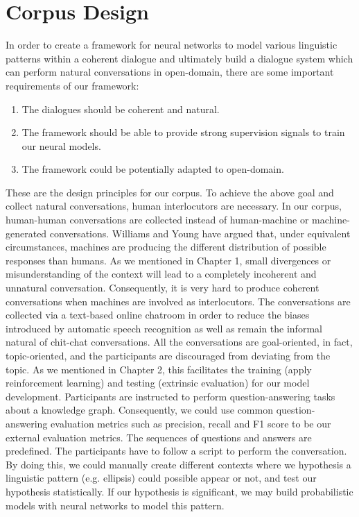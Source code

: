 \documentclass[bsc,frontabs,twoside,singlespacing,parskip,deptreport]{infthesis}     %
\begin{document}
\section{Corpus Design}

In order to create a framework for neural networks to model various linguistic patterns within a coherent dialogue and ultimately build a dialogue system which can perform natural conversations in open-domain, there are some important requirements of our framework:

\begin{enumerate}
   \item The dialogues should be coherent and natural.
   
   \item The framework should be able to provide strong supervision signals to train our neural models. 
 
   \item The framework could be potentially adapted to open-domain.
\end{enumerate}

These are the design principles for our corpus. To achieve the above goal and collect natural conversations, human interlocutors are necessary. In our corpus, human-human conversations are collected instead of human-machine or machine-generated conversations. Williams and Young \cite{williams2007partially} have argued that, under equivalent circumstances, machines are producing the different distribution of possible responses than humans. As we mentioned in Chapter 1, small divergences or misunderstanding of the context will lead to a completely incoherent and unnatural conversation. Consequently, it is very hard to produce coherent conversations when machines are involved as interlocutors. The conversations are collected via a text-based online chatroom in order to reduce the biases introduced by automatic speech recognition \cite{williams2007partially} as well as remain the informal natural of chit-chat conversations. All the conversations are goal-oriented, in fact, topic-oriented, and the participants are discouraged from deviating from the topic. As we mentioned in Chapter 2, this facilitates the training (apply reinforcement learning) and testing (extrinsic evaluation) for our model development. Participants are instructed to perform question-answering tasks about a knowledge graph. Consequently, we could use common question-answering evaluation metrics such as precision, recall and F1 score to be our external evaluation metrics. The sequences of questions and answers are predefined. The participants have to follow a script to perform the conversation. By doing this, we could manually create different contexts where we hypothesis a linguistic pattern (e.g. ellipsis) could possible appear or not, and test our hypothesis statistically. If our hypothesis is significant, we may build probabilistic models with neural networks to model this pattern.
\end{document}
